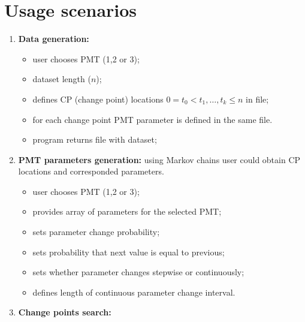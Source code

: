 \documentclass[a4paper,12pt]{report} %
\theoremstyle{definition}
\begin{document}
\section{Usage scenarios}

\begin{enumerate}
\item \textbf{Data generation: }
\begin{itemize}
\item user chooses PMT (1,2 or 3); 
\item dataset length ($n$);
\item defines CP (change point) locations $0 = t_0 < t_1, \ldots, t_k \leq n$ in file;
\item for each change point PMT parameter is defined in the same file.  
\item program returns file with dataset; 
\end{itemize}

\item \textbf{PMT parameters generation:} using Markov chains user could obtain  CP locations and corresponded parameters.
\begin{itemize}
\item user chooses PMT (1,2 or 3);
\item provides array of parameters for the selected PMT;
\item sets parameter change probability;
\item sets probability that next value is equal to previous;
\item sets whether parameter changes stepwise or continuously;
\item defines length of continuous parameter change interval.
\end{itemize}

\item \textbf{Change points search: } 


\end{enumerate}
\end{document}

